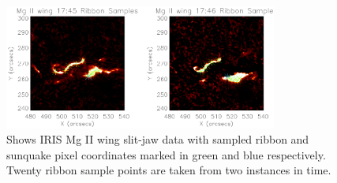 \begin{figure}%
  \begin{center}
  \includegraphics[width=0.8\textwidth]{29-Mar-14-MGW-Ribbon-Coord-oplot}
  \end{center}
  \caption{Shows IRIS Mg II wing slit-jaw data with sampled ribbon and sunquake pixel coordinates marked in green and blue respectively. Twenty ribbon sample points are taken from two instances in time.}\label{mgwrib}
\end{figure}
